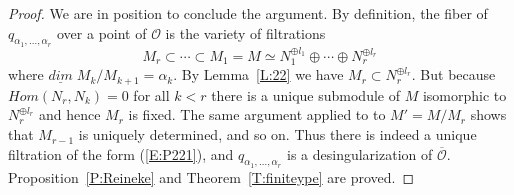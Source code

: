 \documentclass[a4paper,10pt]{amsart}
\def\a{\alpha}
\numberwithin{equation}{section}
\begin{document}
\begin{proof}
We are in position to conclude the argument. By definition, the fiber of $q_{\a_1, \dots, \a_r}$ over a point of $\mathcal{O}$ is the variety of filtrations
\begin{equation}\label{E:P221}
M_r \subset \cdots \subset M_1=M \simeq N_1^{\oplus l_1} \oplus \cdots \oplus N_r^{\oplus l_r}
\end{equation}
where $\underline{dim}\;M_k/M_{k+1}=\a_k$. By Lemma~\ref{L:22} we have $M_r \subset N_r^{\oplus l_r}$. But because $Hom(N_r,N_k)=0$ for all $k<r$ there is a unique submodule of $M$ isomorphic to $N_r^{\oplus l_r}$ and hence $M_r$ is fixed. The same argument applied to to $M'=M/M_r$ shows that $M_{r-1}$ is uniquely determined, and so on. Thus there is indeed a unique filtration of the form (\ref{E:P221}), and $q_{\a_1, \ldots, \a_r}$ is a desingularization of $\overline{\mathcal{O}}$. Proposition~\ref{P:Reineke} and Theorem~\ref{T:finiteype} are proved.
\end{proof}

\vspace{.2in}
\end{document}

